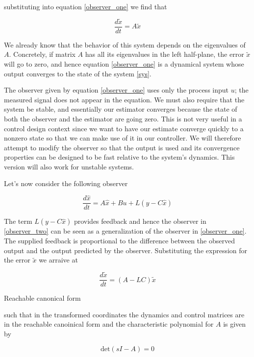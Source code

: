 substituting into equation \ref{observer_one} we find that


\begin{equation}
\frac{d\tilde{x}}{dt} = A\tilde{x}  
\end{equation}  

We already know that the behavior of this system depends on the eigenvalues of $A$. Concretely, if matrix $A$ has all its eigenvalues in the left half-plane, the error $\tilde{x}$ will go to zero,
and hence equation \ref{observer_one} is a dynamical system whose output converges to the state
of the system \ref{sys}.


The observer given by equation \ref{observer_one} uses only the process input $u$; the measured
signal does not appear in the equation. We must also require that the system be stable,
and essentially our estimator converges because the state of both the observer and
the estimator are going zero. This is not very useful in a control design context since
we want to have our estimate converge quickly to a nonzero state so that we can
make use of it in our controller. We will therefore attempt to modify the observer
so that the output is used and its convergence properties can be designed to be fast
relative to the system’s dynamics. This version will also work for unstable systems.

Let's now consider the following observer

\begin{equation}
\frac{d \hat{x}}{dt} = A\hat{x} + Bu + L(y- C \hat{x})
\label{observer_two}   
\end{equation}

The term $L(y- C \hat{x})$ provides feedback and hence the observer in \ref{observer_two} can be seen as a generalization of the observer in \ref{observer_one}. The supplied feedback is proportional to the difference between the observed output and the output predicted by the observer. Substituting the expression for the error $\tilde{x}$ we arraive at

 \begin{equation}
\frac{d\tilde{x}}{dt} = (A-LC)\tilde{x} 
\label{observer_two}   
\end{equation}  

\begin{framed}
\theoremstyle{theorem}
\begin{theorem}{Reachable canonical form}


such that in the transformed coordinates  the dynamics and control matrices are in the reachable 
canoinical form and the characteristic polynomial for $A$ is given by

\begin{equation}
\text{det}(sI-A) = 0 \nonumber
\end{equation}

\end{theorem}
\end{framed}



